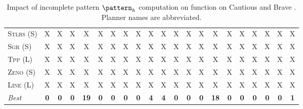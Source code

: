 \documentclass[11pt,landscape]{article}
\begin{document}
\begin{table}[tb]
{\begin{tabular}{|l||cccccccccc||cccccccccc||}
\textsc{Stlrs} (S)&X&X&X&X&X&X&X&X&X&X&X&X&X&X&X&X&X&X&X&X\\
\textsc{Sgr} (S)&X&X&X&X&X&X&X&X&X&X&X&X&X&X&X&X&X&X&X&X\\
\textsc{Tpp} (L)&X&X&X&X&X&X&X&X&X&X&X&X&X&X&X&X&X&X&X&X\\
\textsc{Zeno} (S)&X&X&X&X&X&X&X&X&X&X&X&X&X&X&X&X&X&X&X&X\\
\textsc{Line} (L)&X&X&X&X&X&X&X&X&X&X&X&X&X&X&X&X&X&X&X&X
\\\hline
\textit{Best}&\textbf{0}&\textbf{0}&\textbf{0}&\textbf{19}&\textbf{0}&\textbf{0}&\textbf{0}&\textbf{0}&\textbf{4}&\textbf{4}&\textbf{0}&\textbf{0}&\textbf{0}&\textbf{18}&\textbf{0}&\textbf{0}&\textbf{0}&\textbf{0}&\textbf{0}&\textbf{1}\\\hline

        \end{tabular}}
        \caption{Impact of incomplete pattern $\pattern_h$ computation on function on Cautious and Brave \pattyd. Planner names are abbreviated.}
        \label{tab:abl-patternh-incomplete}
        \end{table}
        
\end{document}
